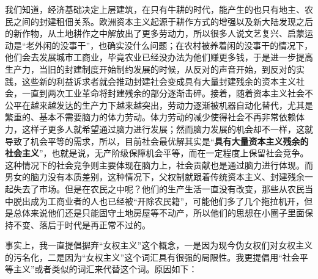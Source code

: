 \documentclass{ctexart}
\begin{document}
	我们知道，经济基础决定上层建筑，在只有牛耕的时代，能产生的也只有地主、农民之间的封建租佃关系。欧洲资本主义起源于耕作方式的增强以及新大陆发现之后的新作物，从土地耕作之中解放出了更多劳动力，所以很多人说文艺复兴、启蒙运动是“老外闲的没事干”，也确实没什么问题；在农村被养着闲的没事干的情况下，他们会去发展城市工商业，毕竟农业已经没办法为他们赚更多钱，于是进一步提高生产力，当旧的封建制度开始制约发展的时候，从反对的声音开始，到反对的实践，这些新的利益诉求者就会推动封建社会变成具有大量封建残余的资本主义社会，一直到两次工业革命将封建残余的部分逐渐击碎。接着，随着资本主义社会不公平在越来越发达的生产力下越来越突出，劳动力逐渐被机器自动化替代，尤其是繁重的、基本不需要脑力的体力劳动。体力劳动的减少使得社会不再非常依赖体力，这样子更多人就希望通过脑力进行发展；然而脑力发展的机会却不一样，这就导致了机会平等的需求，所以，目前社会最优解其实是“{\bf 具有大量资本主义残余的社会主义}”，也就是说，无产阶级保障机会平等，而在一定程度上保留社会竞争。这种情况下的社会竞争则主要体现在脑力上，社会贡献也是通过脑力进行体现。而男女的脑力没有本质差别，这种情况下，父权制就跟着传统资本主义、封建残余一起失去了市场。但是在农民之中呢？他们的生产生活一直没有改变，那些从农民当中脱出成为工商业者的人也已经被“开除农民籍”，可能他们多了几个拖拉机开，但是总体来说他们还是只能固守土地房屋等不动产，所以他们的思想在小圈子里面保持不变、落后于时代是再正常不过的。
	
	事实上，我一直提倡摒弃“女权主义”这个概念，一是因为现今伪女权们对女权主义的污名化，二是因为“女权主义”这个词汇具有很强的局限性。我更提倡用“社会平等主义”或者类似的词汇来代替这个词。原因如下：
	
\end{document}
